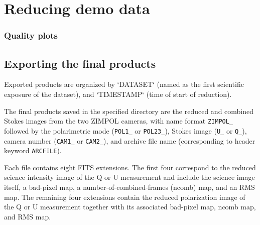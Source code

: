 
\section{Reducing demo data}
\label{sec:reducing_demo_data}



 
\subsubsection{Quality plots}


\subsection{Exporting the final products}
\label{sec:export_final_products}




 \clearpage
 
Exported products are organized by `DATASET` (named as the first scientific exposure of the dataset), and `TIMESTAMP` (time of start of reduction). 

The final products saved in the specified directory are the reduced and combined Stokes images from the two ZIMPOL cameras,
with name format \texttt{ZIMPOL\_} followed by the polarimetric mode (\texttt{POL1\_} or \texttt{POL23\_}), Stokes image (\texttt{U\_} or \texttt{Q\_}), camera number (\texttt{CAM1\_} or \texttt{CAM2\_}),
and archive file name (corresponding to header keyword \texttt{ARCFILE}).

Each file contains eight FITS extensions. The first four correspond to the reduced science intensity image of the Q or U measurement and include the science image itself, a bad-pixel map, a number-of-combined-frames (ncomb) map, and an RMS map. The remaining four extensions contain the reduced polarization image of the Q or U measurement together with its associated bad-pixel map, ncomb map, and RMS map.